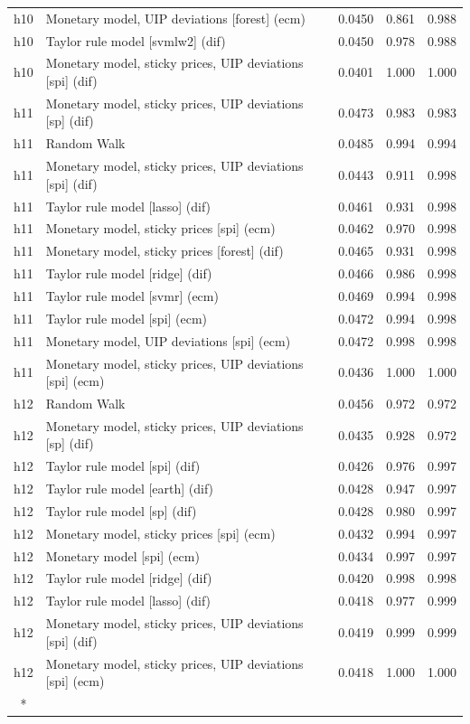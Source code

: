 \begin{ThreePartTable}
\begin{longtable}[t]{cp{5.5cm}ccc}
h10 & \raggedright Monetary model, UIP deviations [forest] (ecm) & 0.0450 & 0.861 & 0.988\\
h10 & \raggedright Taylor rule model [svmlw2] (dif) & 0.0450 & 0.978 & 0.988\\
h10 & \raggedright Monetary model, sticky prices, UIP deviations [spi] (dif) & 0.0401 & 1.000 & 1.000\\
\addlinespace
h11 & \raggedright Monetary model, sticky prices, UIP deviations [sp] (dif) & 0.0473 & 0.983 & 0.983\\
h11 & \raggedright Random Walk & 0.0485 & 0.994 & 0.994\\
h11 & \raggedright Monetary model, sticky prices, UIP deviations [spi] (dif) & 0.0443 & 0.911 & 0.998\\
h11 & \raggedright Taylor rule model [lasso] (dif) & 0.0461 & 0.931 & 0.998\\
h11 & \raggedright Monetary model, sticky prices [spi] (ecm) & 0.0462 & 0.970 & 0.998\\
h11 & \raggedright Monetary model, sticky prices [forest] (dif) & 0.0465 & 0.931 & 0.998\\
h11 & \raggedright Taylor rule model [ridge] (dif) & 0.0466 & 0.986 & 0.998\\
h11 & \raggedright Taylor rule model [svmr] (ecm) & 0.0469 & 0.994 & 0.998\\
h11 & \raggedright Taylor rule model [spi] (ecm) & 0.0472 & 0.994 & 0.998\\
h11 & \raggedright Monetary model, UIP deviations [spi] (ecm) & 0.0472 & 0.998 & 0.998\\
h11 & \raggedright Monetary model, sticky prices, UIP deviations [spi] (ecm) & 0.0436 & 1.000 & 1.000\\
\addlinespace
h12 & \raggedright Random Walk & 0.0456 & 0.972 & 0.972\\
h12 & \raggedright Monetary model, sticky prices, UIP deviations [sp] (dif) & 0.0435 & 0.928 & 0.972\\
h12 & \raggedright Taylor rule model [spi] (dif) & 0.0426 & 0.976 & 0.997\\
h12 & \raggedright Taylor rule model [earth] (dif) & 0.0428 & 0.947 & 0.997\\
h12 & \raggedright Taylor rule model [sp] (dif) & 0.0428 & 0.980 & 0.997\\
h12 & \raggedright Monetary model, sticky prices [spi] (ecm) & 0.0432 & 0.994 & 0.997\\
h12 & \raggedright Monetary model [spi] (ecm) & 0.0434 & 0.997 & 0.997\\
h12 & \raggedright Taylor rule model [ridge] (dif) & 0.0420 & 0.998 & 0.998\\
h12 & \raggedright Taylor rule model [lasso] (dif) & 0.0418 & 0.977 & 0.999\\
h12 & \raggedright Monetary model, sticky prices, UIP deviations [spi] (dif) & 0.0419 & 0.999 & 0.999\\
h12 & \raggedright Monetary model, sticky prices, UIP deviations [spi] (ecm) & 0.0418 & 1.000 & 1.000\\*
\end{longtable}
\end{ThreePartTable}
\endgroup{}

